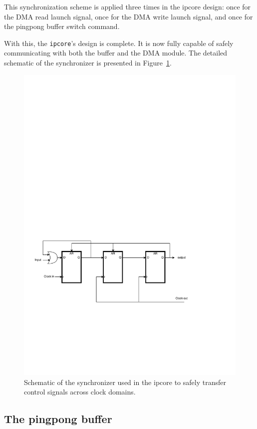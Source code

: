 \documentclass[a4paper,11pt,oneside]{report}
\begin{document}
This synchronization scheme is applied three times in the ipcore design: 
once for the DMA read launch signal, once for the DMA write launch signal, and once for the pingpong buffer switch command.

With this, the \texttt{ipcore}'s design is complete. It is now fully capable of safely communicating with both the buffer and the DMA module. 
The detailed schematic of the synchronizer is presented in Figure~\ref{fig:sync}.

\begin{figure}[H]
    \centering
    \includegraphics[width=0.9\linewidth]{figures/clock_synchronizer.pdf}
    \caption{Schematic of the synchronizer used in the ipcore to safely transfer control signals across clock domains.}
    \label{fig:sync}
\end{figure}


\subsection{The pingpong buffer}
\end{document}

